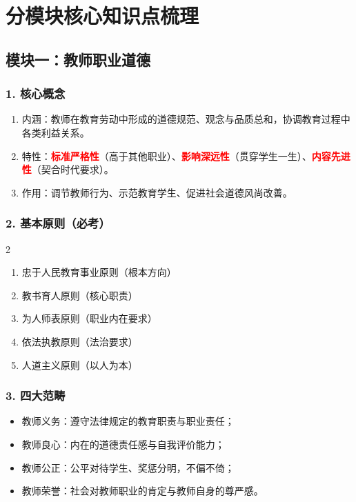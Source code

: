 \documentclass[12pt,a4paper]{article}
\newcommand{\important}[1]{\textbf{\textcolor{red}{#1}}} %
\begin{document}
\newpage

\section{分模块核心知识点梳理}
\subsection{模块一：教师职业道德}
\subsubsection{1. 核心概念}
\begin{enumerate}[label=1.,itemsep=0.3ex]
\item 内涵：教师在教育劳动中形成的道德规范、观念与品质总和，协调教育过程中各类利益关系。
\item 特性：\important{标准严格性}（高于其他职业）、\important{影响深远性}（贯穿学生一生）、\important{内容先进性}（契合时代要求）。
\item 作用：调节教师行为、示范教育学生、促进社会道德风尚改善。
\end{enumerate}

\subsubsection{2. 基本原则（必考）}
\begin{multicols}{2}
\begin{enumerate}[label=•,itemsep=0.5ex]
\item 忠于人民教育事业原则（根本方向）
\item 教书育人原则（核心职责）
\item 为人师表原则（职业内在要求）
\item 依法执教原则（法治要求）
\item 人道主义原则（以人为本）
\end{enumerate}
\end{multicols}

\subsubsection{3. 四大范畴}
\begin{itemize}
    \item 教师义务：遵守法律规定的教育职责与职业责任；
    \item 教师良心：内在的道德责任感与自我评价能力；
    \item 教师公正：公平对待学生、奖惩分明，不偏不倚；
    \item 教师荣誉：社会对教师职业的肯定与教师自身的尊严感。
\end{itemize}
\end{document}
